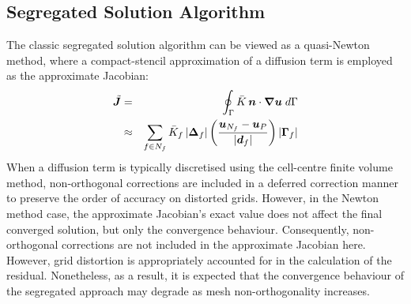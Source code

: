 \documentclass[sn-mathphys,Numbered,draft]{sn-jnl}%
\newcommand{\bb}{\boldsymbol}
\begin{document}
\subsection{Segregated Solution Algorithm} 
\label{sec:seg_alg}
The classic segregated solution algorithm can be viewed as a quasi-Newton method, where a compact-stencil approximation of a diffusion term is employed as the approximate Jacobian:
\begin{eqnarray} \label{eq:diffusion}
	\tilde{\bb{J}} &=& \oint_{\Gamma} \bar{K} \, \bb{n} \cdot \bb{\nabla} \bb{u} \; d\Gamma \notag \\
	&\approx&
	\sum_{f \in N_f} \bar{K}_f \left|\bb{\Delta}_f\right| \left(\frac{\bb{u}_{N_f} - \bb{u}_P}{\left|\bb{d}_f\right|}\right)\left|\bb{\Gamma}_f\right|
\end{eqnarray}
When a diffusion term is typically discretised using the cell-centre finite volume method, non-orthogonal corrections are included in a deferred correction manner to preserve the order of accuracy on distorted grids.
However, in the Newton method case, the approximate Jacobian's exact value does not affect the final converged solution, but only the convergence behaviour.
Consequently, non-orthogonal corrections are not included in the approximate Jacobian here. However, grid distortion is appropriately accounted for in the calculation of the residual.
Nonetheless, as a result, it is expected that the convergence behaviour of the segregated approach may degrade as mesh non-orthogonality increases.
\end{document}
